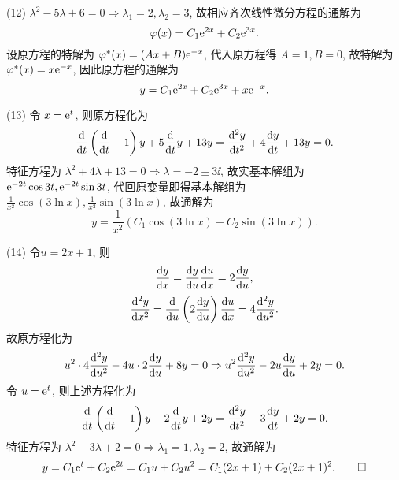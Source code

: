 \begin{solve}
  (12) $\lambda^2-5\lambda+6=0\Rightarrow\lambda_1=2,\lambda_2=3$, 故相应齐次线性微分方程的通解为
  \[\varphi(x)=C_1\mathrm{e}^{2x}+C_2\mathrm{e}^{3x}.\]
  设原方程的特解为 $\varphi^*(x)=(Ax+B)\mathrm{e}^{-x}$, 代入原方程得 $A=1,B=0$, 
  故特解为 $\varphi^*(x)=x\mathrm{e}^{-x}$, 因此原方程的通解为
  \[y=C_1\mathrm{e}^{2x}+C_2\mathrm{e}^{3x}+x\mathrm{e}^{-x}.\]

  (13) 令 $x=\mathrm{e}^t$, 则原方程化为
  \[\frac{\diff}{\diff t}\left(\frac{\diff}{\diff t}-1\right)y+5\frac{\diff}{\diff t}y+13y
    = \frac{\diff^2y}{\diff t^2}+4\frac{\diff y}{\diff t}+13y=0.\]
  特征方程为 $\lambda^2+4\lambda+13=0\Rightarrow\lambda=-2\pm3\ii$, 
  故实基本解组为 $\mathrm{e}^{-2t}\cos3t,\mathrm{e}^{-2t}\sin3t$, 
  代回原变量即得基本解组为 $\frac{1}{x^2}\cos(3\ln x),\frac{1}{x^2}\sin(3\ln x)$, 故通解为
  \[y=\frac{1}{x^2}(C_1\cos(3\ln x)+C_2\sin(3\ln x)).\]

  (14) 令$u=2x+1$, 则
  \[\frac{\diff y}{\diff x}=\frac{\diff y}{\diff u}\frac{\diff u}{\diff x}=2\frac{\diff y}{\diff u},\]
  \[\frac{\diff^2y}{\diff x^2}=\frac{\diff}{\diff u}\left(2\frac{\diff y}{\diff u}\right)\frac{\diff u}{\diff x}=4\frac{\diff^2y}{\diff u^2}.\]
  故原方程化为
  \[u^2\cdot4\frac{\diff^2y}{\diff u^2}-4u\cdot2\frac{\diff y}{\diff u}+8y=0
    \Rightarrow u^2\frac{\diff^2y}{\diff u^2}-2u\frac{\diff y}{\diff u}+2y=0.\]
  令 $u=\mathrm{e}^t$, 则上述方程化为
  \[\frac{\diff}{\diff t}\left(\frac{\diff}{\diff t}-1\right)y-2\frac{\diff}{\diff t}y+2y
    = \frac{\diff^2y}{\diff t^2}-3\frac{\diff y}{\diff t}+2y=0.\]
  特征方程为 $\lambda^2-3\lambda+2=0\Rightarrow\lambda_1=1,\lambda_2=2$, 故通解为
  \[y=C_1\mathrm{e}^t+C_2\mathrm{e}^{2t}=C_1u+C_2u^2=C_1(2x+1)+C_2(2x+1)^2.\qedhere\]
\end{solve}